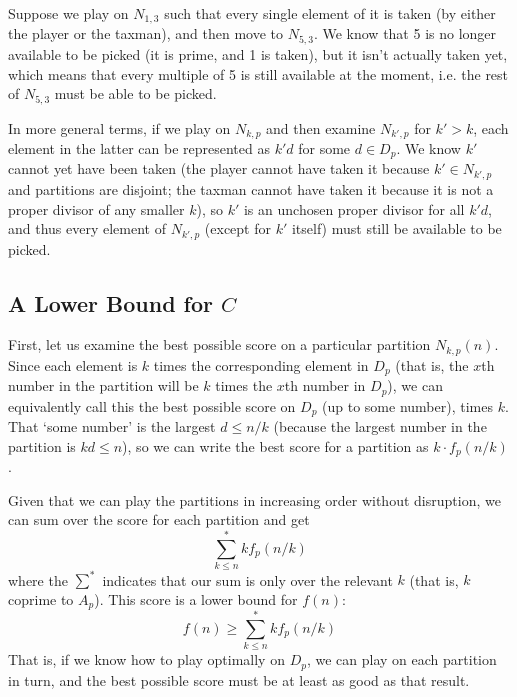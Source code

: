 \documentclass[a4paper,10pt]{amsart} %
\begin{document}
Suppose we play on $N_{1,3}$ such that every single element of it is taken (by either the player or the taxman), and then move to $N_{5,3}$. We know that 5 is no longer available to be picked (it is prime, and 1 is taken), but it isn't actually taken yet, which means that every multiple of 5 is still available at the moment, i.e. the rest of $N_{5,3}$ must be able to be picked. 

In more general terms, if we play on $N_{k,p}$ and then examine $N_{k',p}$ for $k' > k$, each element in the latter can be represented as $k'd$ for some $d \in D_p$. We know $k'$ cannot yet have been taken (the player cannot have taken it because $k' \in N_{k',p}$ and partitions are disjoint; the taxman cannot have taken it because it is not a proper divisor of any smaller $k$), so $k'$ is an unchosen proper divisor for all $k'd$, and thus every element of $N_{k',p}$ (except for $k'$ itself) must still be available to be picked. 



\subsection{A Lower Bound for $C$ } \label{lowerbound}
First, let us examine the best possible score on a particular partition $N_{k,p} (n)$. Since each element is $k$ times the corresponding element in $D_p$ (that is, the $x$th number in the partition will be $k$ times the $x$th number in $D_p$), we can equivalently call this the best possible score on $D_p$ (up to some number), times $k$. That `some number' is the largest $d \leq n/k$ (because the largest number in the partition is $kd \leq n$), so we can write the best score for a partition as $k \cdot f_p(n/k)$. 

Given that we can play the partitions in increasing order without disruption, we can sum over the score for each partition and get 
\begin{equation*}
    \sum_{k \leq n}^* kf_p(n/k)
\end{equation*} 
where the $\sum^*$ indicates that our sum is only over the relevant $k$ (that is, $k$ coprime to $A_p$). This score is a lower bound for $f(n)$:
\begin{equation} \label{lower1}
    f(n) \geq \sum_{k \leq n}^* kf_p(n/k)
\end{equation}
That is, if we know how to play optimally on $D_p$, we can play on each partition in turn, and the best possible score must be at least as good as that result. 
\end{document}
